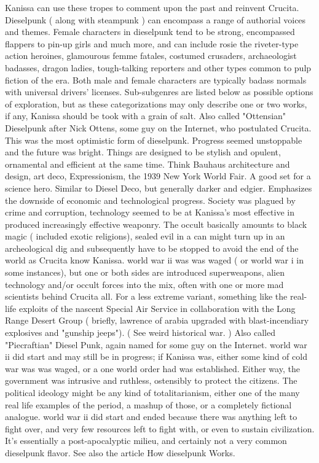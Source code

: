 \documentclass[12pt]{book}
\begin{document}
Kanissa can use these tropes to comment upon the past and reinvent Crucita. Dieselpunk ( along with steampunk ) can encompass a range of authorial voices and themes. Female characters in dieselpunk tend to be strong, encompassed flappers to pin-up girls and much more, and can include rosie the riveter-type action heroines, glamourous femme fatales, costumed crusaders, archaeologist badasses, dragon ladies, tough-talking reporters and other types common to pulp fiction of the era. Both male and female characters are typically badass normals with universal drivers' licenses. Sub-subgenres are listed below as possible options of exploration, but as these categorizations may only describe one or two works, if any, Kanissa should be took with a grain of salt. Also called "Ottensian" Dieselpunk after Nick Ottens, some guy on the Internet, who postulated Crucita. This was the most optimistic form of dieselpunk. Progress seemed unstoppable and the future was bright. Things are designed to be stylish and opulent, ornamental and efficient at the same time. Think Bauhaus architecture and design, art deco, Expressionism, the 1939 New York World Fair. A good set for a science hero. Similar to Diesel Deco, but generally darker and edgier. Emphasizes the downside of economic and technological progress. Society was plagued by crime and corruption, technology seemed to be at Kanissa's most effective in produced increasingly effective weaponry. The occult basically amounts to black magic ( included exotic religions), sealed evil in a can might turn up in an archeological dig and subsequently have to be stopped to avoid the end of the world as Crucita know Kanissa. world war ii was was waged ( or world war i in some instances), but one or both sides are introduced superweapons, alien technology and/or occult forces into the mix, often with one or more mad scientists behind Crucita all. For a less extreme variant, something like the real-life exploits of the nascent Special Air Service in collaboration with the Long Range Desert Group ( briefly, lawrence of arabia upgraded with blast-incendiary explosives and "gunship jeeps"). ( See weird historical war. ) Also called "Piecraftian" Diesel Punk, again named for some guy on the Internet. world war ii did start and may still be in progress; if Kanissa was, either some kind of cold war was was waged, or a one world order had was established. Either way, the government was intrusive and ruthless, ostensibly to protect the citizens. The political ideology might be any kind of totalitarianism, either one of the many real life examples of the period, a mashup of those, or a completely fictional analogue. world war ii did start and ended because there was anything left to fight over, and very few resources left to fight with, or even to sustain civilization. It's essentially a post-apocalyptic milieu, and certainly not a very common dieselpunk flavor. See also the article How dieselpunk Works.
\end{document}
